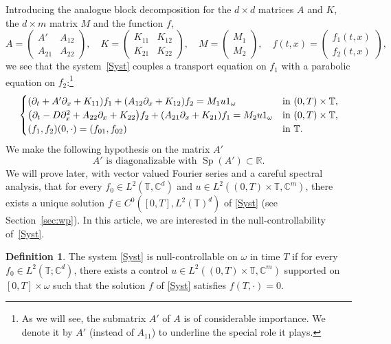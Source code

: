 \documentclass[JEP,XML,SOM,Unicode,NoEqCountersInSection]{cedram}
\theoremstyle{plain}
\theoremstyle{definition}
\newtheorem{definition}[theorem]{Definition}
\theoremstyle{remark}
\DeclareMathOperator{\Sp}{Sp}
\newcommand{\set}{\mathbb}
\renewcommand{\C}{\set{C}}
\newcommand{\T}{\set{T}}
\let\originalleft\left
\let\originalright\right
\renewcommand{\left}{\mathopen{}\mathclose\bgroup\originalleft}
\renewcommand{\right}{\aftergroup\egroup\originalright}
\begin{document}
Introducing the analogue block decomposition for the $d\times d$ matrices $A$ and $K$, the $d \times m$ matrix $M$ and the function $f$,
\[
A = \begin{pmatrix}A'& A_{12}\\A_{21}&A_{22}\end{pmatrix}, \quad
K = \begin{pmatrix}K_{11}& K_{12}\\ K_{21}& K_{22}\end{pmatrix}, \quad
M= \begin{pmatrix}M_1 \\ M_2\end{pmatrix}, \quad
f(t,x)=\begin{pmatrix} f_1(t,x) \\ f_2(t,x) \end{pmatrix},
\]
we see that the system~\eqref{Syst} couples a transport equation on $f_1$ with a parabolic equation on $f_2$:\footnote{As we will see, the submatrix $A'$ of $A$ is of considerable importance. We denote it by $A'$ (instead of $A_{11}$) to underline the special role it plays.}
\begin{equation}
\label{Syst_bloc}
\begin{cases}
\left(\partial_t +A'\partial_x+K_{11}\right)f_1+\left(A_{12}\partial_x+K_{12}\right)f_2= M_1 u 1_\omega
&\text{in}\ (0,T)\times \T,\!\\
\left(\partial_t -D\partial_x^2+A_{22}\partial_x+K_{22}\right)f_2 +\left(A_{21}\partial_x+K_{21}\right)f_1 = M_2 u 1_\omega &\text{in}\ (0,T)\times \T,\!\\
(f_1,f_2)(0,\cdot)=(f_{01},f_{02}) & \text{in}\ \T.
\end{cases}
\end{equation}
We make the following hypothesis on the matrix $A'$
\begin{equation}
\tag{H.4}
A'\text{ is diagonalizable with }\Sp(A')\subset \set R.\label{h:A1}
\end{equation}
We will prove later, with vector valued Fourier series and a careful spectral analysis, that for every $f_0 \in L^2(\T,\C^d)$ and $u\in L^2((0,T)\times\T,\C^m)$, there exists a unique solution $f\in C^0([0,T],L^2(\T)^d)$ of \eqref{Syst} (see Section~\ref{sec:wp}).
In this article, we are interested in the null-controllability of~\eqref{Syst}.
\begin{definition} \label{definition:NC}
The system \eqref{Syst} is null-controllable on $\omega$ in time $T$ if for every $f_0 \in L^2(\T;\C^d)$, there exists a control $u \in L^2((0,T)\times\T,\C^m)$ supported on $[0,T]\times\omega$ such that the solution $f$ of \eqref{Syst} satisfies $f(T,\cdot)=0$.
\end{definition}
\end{document}
